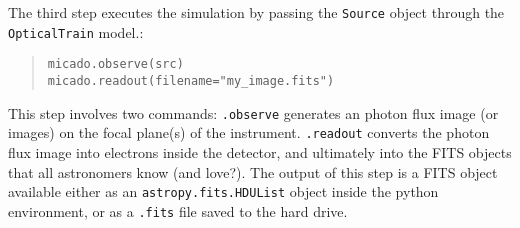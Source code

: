 The third step executes the simulation by passing the \texttt{Source} object through the \texttt{OpticalTrain} model.:

\begin{quote}
\begin{alltt}
\begin{lstlisting}[frame=single]
micado.observe(src)
micado.readout(filename="my_image.fits")
\end{lstlisting}
\end{alltt}
\end{quote}

This step involves two commands:
\texttt{.observe} generates an photon flux image (or images) on the focal plane(s) of the instrument.
\texttt{.readout} converts the photon flux image into electrons inside the detector, and ultimately into the FITS objects that all astronomers know (and love?).
The output of this step is a FITS object available either as an \texttt{astropy.fits.HDUList} object inside the python environment, or as a \texttt{.fits} file saved to the hard drive.
